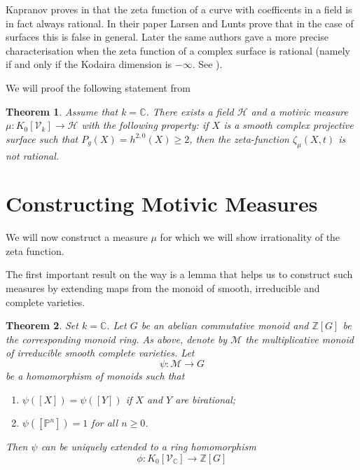 \documentclass[11pt, a4paper, german]{article}
\theoremstyle{plain}
\newtheorem{theorem}{Theorem}
\theoremstyle{definition}
\newcommand{\gring}[1][k]{K_0[\mathcal{V}_#1]}
\begin{document}
Kapranov proves in \cite{kapranov} that the zeta function of a curve with coefficents in a field is in fact always rational. 
In their paper \cite{MR1996804} Larsen and Lunts prove that in the case of surfaces this is false in general.
Later the same authors gave a more precise characterisation when the zeta function of a complex surface is rational 
(namely if and only if the Kodaira dimension is $-\infty$. See \cite{LL2}).

We will proof the following statement from \cite{MR1996804}
\begin{theorem}
    \label{irrational}
    Assume that $k = \mathbb{C}$. There exists a field $\mathcal{H}$ and a motivic measure $\mu \colon \gring \to \mathcal{H}$ with the following
    property: if $X$ is a smooth complex projective surface such that $P_g(X)=h^{2,0}(X) \ge 2$, then the zeta-function $\zeta_{\mu}(X,t)$
    is not rational.
\end{theorem}

\section{Constructing Motivic Measures}

We will now construct a measure $\mu$ for which we will show irrationality of the zeta function.

The first important result on the way is a lemma that helps us to construct such measures by extending maps from the monoid of smooth, irreducible
and complete varieties.

\begin{theorem}
    \label{th1}
    Set $k = \mathbb{C}$. Let $G$ be an abelian commutative monoid and $\mathbb{Z}[G]$ be the corresponding monoid ring. As above, denote
    by $\mathcal{M}$ the multiplicative monoid of irreducible smooth complete varieties. Let
    \[
        \psi: \mathcal{M} \to G
    \]
    be a homomorphism of monoids such that
    \begin{enumerate}
        \item $\psi([X]) = \psi([Y])$ if $X$ and $Y$ are birational;
        \item $\psi([\mathbb{P}^n]) = 1$ for all $n \ge 0$.
    \end{enumerate}
    Then $\psi$ can be uniquely extended to a ring homomorphism 
    \[
        \phi: \gring[\mathbb{C}] \to \mathbb{Z} [G]
    \]
\end{theorem}
\end{document}
